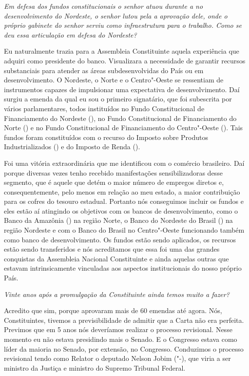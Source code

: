 \medskip

\noindent\emph{Em defesa dos fundos constitucionais o senhor atuou durante a
 no desenvolvimento do Nordeste, o senhor lutou pela a aprovação
dele, onde o próprio gabinete do senhor serviu como infraestrutura para
o trabalho. Como se deu essa articulação em defesa do Nordeste?}

Eu naturalmente trazia para a Assembleia
Constituinte aquela experiência que adquiri como presidente do banco.
Visualizara a necessidade de garantir recursos substanciais para atender
as áreas subdesenvolvidas do País ou em desenvolvimento. O Nordeste, o
Norte e o Centro"-Oeste se ressentiam de instrumentos capazes de
impulsionar uma expectativa de desenvolvimento. Daí surgiu a emenda da
qual eu sou o primeiro signatário, que foi subescrita por vários
parlamentares, todos instituídos no Fundo Constitucional de
Financiamento do Nordeste (), no Fundo Constitucional de
Financiamento do Norte () e no Fundo Constitucional de Financiamento
do Centro"-Oeste (). Tais fundos foram constituídos com o recurso do
Imposto sobre Produtos Industrializados () e do Imposto de Renda
().

Foi uma vitória extraordinária que me identificou com o comércio
brasileiro. Daí porque diversas vezes tenho recebido manifestações
sensibilizadoras desse segmento, que é aquele que detém o maior número
de empregos diretos e, consequentemente, pelo menos em relação ao meu
estado, a maior contribuição para os cofres do tesouro estadual.
Portanto nós conseguimos incluir os fundos e eles estão aí atingindo os
objetivos com os bancos de desenvolvimento, como o Banco da Amazônia
() na região Norte, o Banco do Nordeste do Brasil () na região
Nordeste e com o Banco do Brasil no Centro"-Oeste funcionando também como
banco de desenvolvimento. Os fundos estão sendo aplicados, os recursos
estão sendo transferidos e nós acreditamos que essa foi uma das grandes
conquistas da Assembleia Nacional Constituinte e ainda aquelas outras
que estavam intrinsicamente vinculadas aos aspectos institucionais do
nosso próprio País.

\medskip

\noindent\emph{Vinte anos após a promulgação da Constituinte ainda temos muito
a fazer?}

Acredito que sim, porque aprovaram mais de 60
emendas até agora. Nós, Constituintes, tivemos a previsibilidade de
admitir que a Carta não era perfeita. Previmos que em 5 anos nós
deveríamos realizar o processo revisional. Nesse momento eu não estava
presidindo mais o Senado. E o Congresso estava como líder da maioria no
Senado, por extensão, no Congresso. Conduzimos o processo revisional
tendo como Relator o deputado Nelson Jobim ("-), que viria a ser
ministro da Justiça e ministro do Supremo Tribunal Federal.

